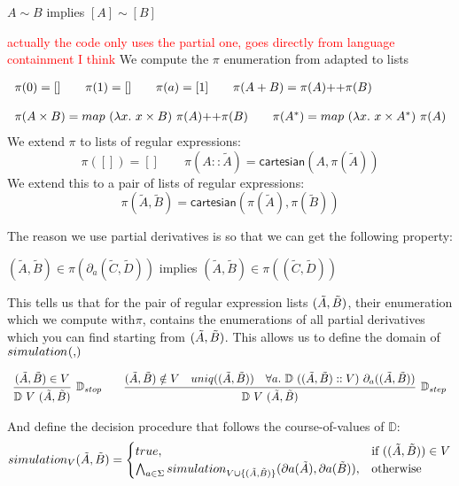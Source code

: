 \documentclass[a4paper,UKenglish,cleveref, autoref, thm-restate]{lipics-v2021}
\newcommand\mycomment[1]{\textcolor{red}{#1}}
\begin{document}
\begin{lemma}
$A \sim B$  implies $[A] \sim [B]$
\end{lemma}
\mycomment{actually the code only uses the partial one, goes directly from language containment I think}
We compute the $\pi$ enumeration from \cite{CZ01} adapted to lists
\begin{definition}[Enumeration]
  \begin{displaymath}
    \begin{array}{lll}
  \pi(0) = [] \qquad \pi(1) = [] \qquad \pi(a) = [1] \qquad \pi(A + B) = \cat{\pi(A)}{\pi(B)} \\\\
  \pi(A \times B) = \cat{\mymap{\lambda x.~x \times B}{\pi(A)}}{\pi(B)} \qquad \pi(A^*) = \mymap{\lambda x.~x \times A^*}{\pi(A)}
    \end{array}
  \end{displaymath}
We extend $\pi$ to lists of regular expressions:
\[\pi([])=[] \qquad \pi(A::\tilde{A}) = \mathsf{cartesian}(A,\pi(\tilde{A}))\]
We extend this to a pair of lists of regular expressions:
\[\pi(\tilde{A},\tilde{B})= \mathsf{cartesian}(\pi(\tilde{A}),\pi(\tilde{B}))\]
\end{definition}
The reason we use partial derivatives is so that we can get the following property:
\begin{lemma}[Closure]\label{lem:closure}
 $(\tilde{A},\tilde{B}) \in \pi(\partial_a(\tilde{C},\tilde{D}))$ implies  $(\tilde{A},\tilde{B}) \in \pi((\tilde{C},\tilde{D}))$ 
\end{lemma}
This tells us that for the pair of regular expression lists $(\tilde{A},\tilde{B})$, their enumeration which we compute with$\pi$, contains the enumerations of all partial derivatives which you can find starting from $(\tilde{A},\tilde{B})$. This allows us to define the domain of $\simulationb{}{}$
\begin{definition}[Domain]
  \begin{displaymath}
    \begin{array}{lll}
      \infer[\mathbb{D}_{stop}]{\domm{V}{\pder{A}{B}}}{\pder{A}{B} \in V} \qquad \infer[\mathbb{D}_{step}]{\domm{V}{\pder{A}{B}}}{\pder{A}{B} \notin V & \mathsf{uniq}(\pder{A}{B}) & \forall a.~\domm{(\pder{A}{B}::V)}{\partial_a(\pder{A}{B})}}
    \end{array}
  \end{displaymath}
\end{definition}
And define the decision procedure that follows the course-of-values of $\mathbb{D}$:
\begin{align}
\simulationb{V}{\tilde{A}}{\tilde{B}} =\begin{cases}
			\true, & \text{if }(\pder{A}{B}) \in V\\
                      \bigwedge_{a \in \Sigma}\simulationb{V \cup \{\pder{A}{B}\}}{\mypar{a}{\tilde{A}}}{\mypar{a}{\tilde{B}}}, & \text{otherwise}
		 \end{cases}
\end{align}
\end{document}
